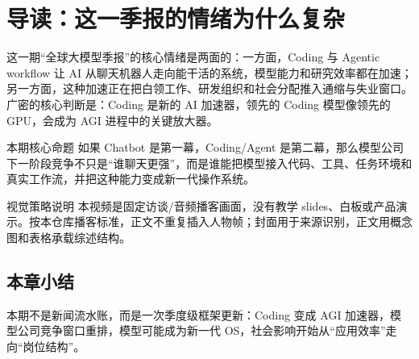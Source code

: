 \section{导读：这一季报的情绪为什么复杂}

这一期“全球大模型季报”的核心情绪是两面的：一方面，Coding 与 Agentic workflow 让 AI 从聊天机器人走向能干活的系统，模型能力和研究效率都在加速；另一方面，这种加速正在把白领工作、研发组织和社会分配推入通缩与失业窗口。广密的核心判断是：Coding 是新的 AI 加速器，领先的 Coding 模型像领先的 GPU，会成为 AGI 进程中的关键放大器。

\begin{importantbox}{本期核心命题}
如果 Chatbot 是第一幕，Coding/Agent 是第二幕，那么模型公司下一阶段竞争不只是“谁聊天更强”，而是谁能把模型接入代码、工具、任务环境和真实工作流，并把这种能力变成新一代操作系统。
\end{importantbox}

\begin{knowledgebox}{视觉策略说明}
本视频是固定访谈/音频播客画面，没有教学 slides、白板或产品演示。按本仓库播客标准，正文不重复插入人物帧；封面用于来源识别，正文用概念图和表格承载综述结构。
\end{knowledgebox}

\subsection{本章小结}

本期不是新闻流水账，而是一次季度级框架更新：Coding 变成 AGI 加速器，模型公司竞争窗口重排，模型可能成为新一代 OS，社会影响开始从“应用效率”走向“岗位结构”。

